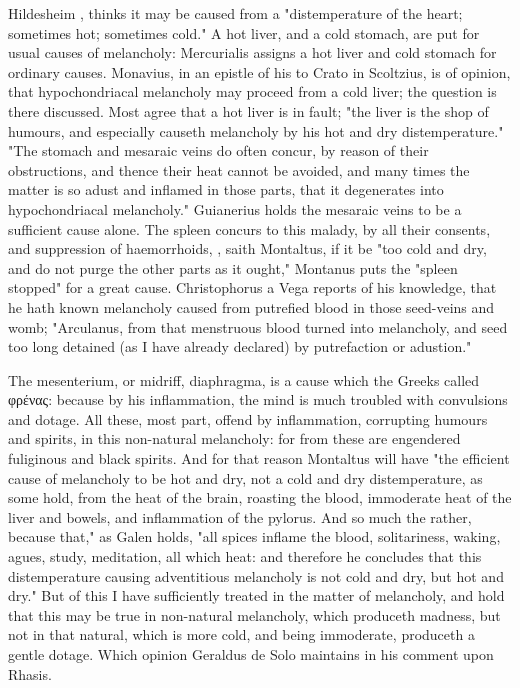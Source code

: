Hildesheim , thinks it may be caused
from a "distemperature of the heart; sometimes hot;
sometimes cold." A hot liver, and a cold stomach, are put for usual causes of
melancholy: Mercurialis  assigns a hot liver and cold stomach for ordinary causes.
Monavius, in an epistle of his to Crato in Scoltzius, is
of opinion, that hypochondriacal melancholy may proceed from a cold liver; the
question is there discussed. Most agree that a hot liver is in fault;
"the liver is the shop of humours, and especially causeth
melancholy by his hot and dry distemperature." "The
stomach and mesaraic veins do often concur, by reason of their obstructions,
and thence their heat cannot be avoided, and many times the matter is so adust
and inflamed in those parts, that it degenerates into hypochondriacal
melancholy." Guianerius  holds the
mesaraic veins to be a sufficient cause alone. The spleen
concurs to this malady, by all their consents, and suppression of haemorrhoids,
, saith Montaltus, if it be
"too cold and dry, and do not purge the other parts as it
ought,"  Montanus puts the
"spleen stopped" for a great cause.
Christophorus a Vega reports of his knowledge, that he
hath known melancholy caused from putrefied blood in those seed-veins and womb;
"Arculanus, from that menstruous blood turned into
melancholy, and seed too long detained (as I have already declared) by
putrefaction or adustion."

The mesenterium, or midriff, diaphragma, is a cause which the
Greeks called \textgreek{φρένας}: because by his
inflammation, the mind is much troubled with convulsions and dotage. All these,
most part, offend by inflammation, corrupting humours and spirits, in this
non-natural melancholy: for from these are engendered fuliginous and black
spirits. And for that reason Montaltus
 will have "the efficient cause
of melancholy to be hot and dry, not a cold and dry distemperature, as some
hold, from the heat of the brain, roasting the blood, immoderate heat of the
liver and bowels, and inflammation of the pylorus. And so much the rather,
because that," as Galen holds, "all spices inflame the blood, solitariness,
waking, agues, study, meditation, all which heat: and therefore he concludes
that this distemperature causing adventitious melancholy is not cold and dry,
but hot and dry." But of this I have sufficiently treated in the matter of
melancholy, and hold that this may be true in non-natural melancholy, which
produceth madness, but not in that natural, which is more cold, and being
immoderate, produceth a gentle dotage. Which opinion
Geraldus de Solo maintains in his comment upon Rhasis.

